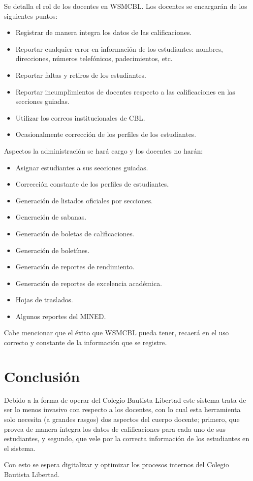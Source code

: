 \documentclass[12pt]{article}
\begin{document}
    Se detalla el rol de los docentes en WSMCBL.
    Los docentes se encargarán de los siguientes puntos:
    \begin{itemize}
        \item Registrar de manera íntegra los datos de las calificaciones.
        \item Reportar cualquier error en información de los estudiantes: nombres, direcciones, números telefónicos, padecimientos, etc.
        \item Reportar faltas y retiros de los estudiantes.
        \item Reportar incumplimientos de docentes respecto a las calificaciones en las secciones guiadas.
        \item Utilizar los correos institucionales de CBL.
        \item Ocasionalmente corrección de los perfiles de los estudiantes.
    \end{itemize}

    Aspectos la administración se hará cargo y los docentes no harán:
    \begin{itemize}
        \item Asignar estudiantes a sus secciones guiadas.
        \item Corrección constante de los perfiles de estudiantes.
        \item Generación de listados oficiales por secciones.
        \item Generación de sabanas.
        \item Generación de boletas de calificaciones.
        \item Generación de boletínes.
        \item Generación de reportes de rendimiento.
        \item Generación de reportes de excelencia académica.
        \item Hojas de traslados.
        \item Algunos reportes del MINED.
    \end{itemize}

    Cabe mencionar que el éxito que WSMCBL pueda tener, recaerá en el uso correcto y constante de la información que se registre.

    \section{Conclusión}

    Debido a la forma de operar del Colegio Bautista Libertad este sistema trata de ser lo menos invasivo con respecto
    a los docentes, con lo cual esta herramienta solo necesita (a grandes rasgos) dos aspectos del cuerpo docente;
    primero, que provea de manera íntegra los datos de calificaciones para cada uno de sus estudiantes, y segundo, que
    vele por la correcta información de los estudiantes en el sistema.

    Con esto se espera digitalizar y optimizar los procesos internos del Colegio Bautista Libertad.
\end{document}
